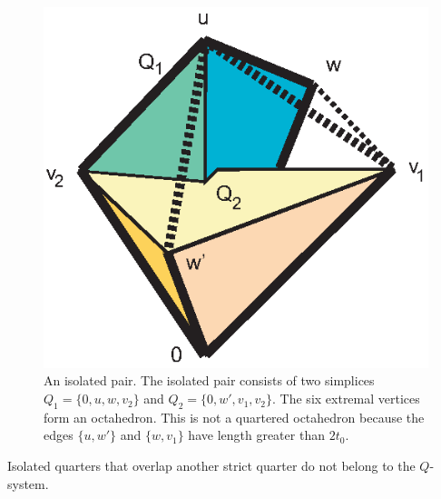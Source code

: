 \begin{figure}[htb]
  \centering
  \includegraphics{PS/isolatedpair.eps}
  \caption{An isolated pair.  The isolated pair consists of two simplices
   $Q_1=\{0,u,w,v_2\}$ and $Q_2=\{0,w',v_1,v_2\}$.  The six extremal vertices
   form an octahedron. This is not a quartered octahedron because the edges
   $\{u,w'\}$ and $\{w,v_1\}$ have length greater than $2t_0$.}
  \label{fig:diag19}
\end{figure}


Isolated quarters that overlap another strict quarter do not
belong to the $Q$-system.



%


